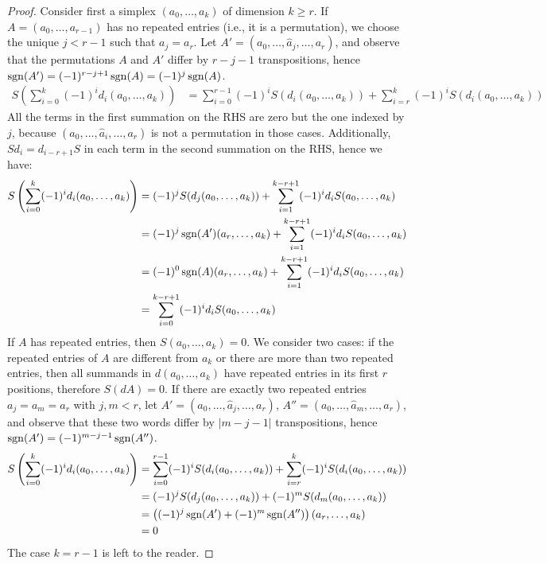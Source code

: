\begin{proof}
	Consider first a simplex $(a_0,\ldots,a_k)$ of dimension $k\geq r$. If $A=(a_{0},\ldots,a_{r-1})$ has no repeated entries (i.e., it is a permutation), we choose the unique $j<r-1$ such that $a_j = a_r$. Let $A' = (a_{0},\ldots,\hat{a}_j,\ldots,a_r)$, and observe that the permutations $A$ and $A'$ differ by $r-j-1$ transpositions, hence $\operatorname*{sgn}(A') = (-1)^{r-j+1}\operatorname*{sgn}(A) = (-1)^j\operatorname*{sgn}(A)$.
	\begin{align*}
		S\left(\sum_{i=0}^k (-1)^id_i (a_0,\ldots,a_k)\right)
		&= \sum_{i=0}^{r-1} (-1)^iS(d_i (a_0,\ldots,a_k)) + \sum_{i=r}^{k} (-1)^iS(d_i (a_0,\ldots,a_k))
	\end{align*}
	All the terms in the first summation on the RHS are zero but the one indexed by $j$, because $(a_0,\ldots,\hat{a}_i,\ldots,a_r)$ is not a permutation in those cases. Additionally, $Sd_i = d_{i-r+1}S$ in each term in the second summation on the RHS, hence we have:
	\begin{align*}
		S\left(\sum_{i=0}^k (-1)^id_i (a_0,\ldots,a_k)\right)
		&= (-1)^jS(d_j (a_0,\ldots,a_k)) + \sum_{i=1}^{k-r+1} (-1)^i d_i S(a_0,\ldots,a_k)\\
		&= (-1)^{j}\operatorname*{sgn}(A')(a_r,\ldots,a_k) + \sum_{i=1}^{k-r+1} (-1)^i d_i S(a_0,\ldots,a_k)\\
		&= (-1)^{0}\operatorname*{sgn}(A)(a_r,\ldots,a_k) + \sum_{i=1}^{k-r+1} (-1)^i d_i S(a_0,\ldots,a_k)\\
		&= \sum_{i=0}^{k-r+1} (-1)^i d_i S(a_0,\ldots,a_k)
	\end{align*}
If $A$ has repeated entries, then $S(a_0,\ldots,a_k) = 0$. We consider two cases: if the repeated entries of $A$ are different from $a_k$ or there are more than two repeated entries, then all summands in $d(a_0,\ldots,a_k)$ have repeated entries in its first $r$ positions, therefore $S(dA)=0$. If there are exactly two repeated entries $a_j=a_m = a_r$ with $j,m<r$, let $A' = (a_0,\ldots,\hat{a}_j,\ldots,a_{r})$, $A'' = (a_0,\ldots,\hat{a}_m,\ldots,a_{r})$, and observe that these two words differ by $|m-j-1|$ transpositions, hence $\operatorname*{sgn}(A') = (-1)^{m-j-1}\operatorname*{sgn}(A'')$.
\begin{align*}
	S\left(\sum_{i=0}^k (-1)^id_i (a_0,\ldots,a_k)\right)
	&= \sum_{i=0}^{r-1} (-1)^iS(d_i (a_0,\ldots,a_k)) + \sum_{i=r}^{k} (-1)^iS(d_i (a_0,\ldots,a_k)) \\
	&= (-1)^jS(d_j (a_0,\ldots,a_k)) + (-1)^mS(d_m (a_0,\ldots,a_k)) \\
	&= \left((-1)^{j}\operatorname*{sgn}(A') + (-1)^m\operatorname*{sgn}(A'')\right)(a_r,\ldots,a_k)\\
	&= 0
\end{align*}
The case $k=r-1$ is left to the reader.
\end{proof}

